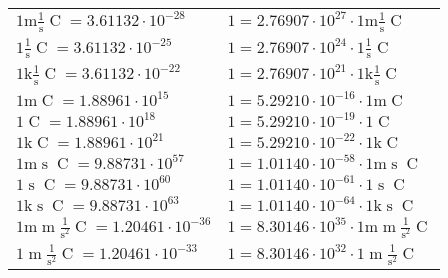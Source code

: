 \begin{center}
\begin{longtable}{l l}
{\color{gray}$1 \bm{\mathrm{ m}}{}\frac1{\operatorname{s}}{\operatorname{C}}{} = 3.61132\cdot10^{-28} $}   & {\color{gray}$ 1 = 2.76907\cdot10^{27} \cdot 1 \bm{\mathrm{ m}}{}\frac1{\operatorname{s}}{\operatorname{C}}{}$}  \\
{\color{black}$1 \bm{\mathrm{ }}{}\frac1{\operatorname{s}}{\operatorname{C}}{} = 3.61132\cdot10^{-25} $}   & {\color{black}$ 1 = 2.76907\cdot10^{24} \cdot 1 \bm{\mathrm{ }}{}\frac1{\operatorname{s}}{\operatorname{C}}{}$}  \\
{\color{gray}$1 \bm{\mathrm{ k}}{}\frac1{\operatorname{s}}{\operatorname{C}}{} = 3.61132\cdot10^{-22} $}   & {\color{gray}$ 1 = 2.76907\cdot10^{21} \cdot 1 \bm{\mathrm{ k}}{}\frac1{\operatorname{s}}{\operatorname{C}}{}$}  \\
{\color{gray}$1 \bm{\mathrm{ m}}{}{}{\operatorname{C}}{} = 1.88961\cdot10^{15} $}   & {\color{gray}$ 1 = 5.29210\cdot10^{-16} \cdot 1 \bm{\mathrm{ m}}{}{}{\operatorname{C}}{}$}  \\
{\color{black}$1 \bm{\mathrm{ }}{}{}{\operatorname{C}}{} = 1.88961\cdot10^{18} $}   & {\color{black}$ 1 = 5.29210\cdot10^{-19} \cdot 1 \bm{\mathrm{ }}{}{}{\operatorname{C}}{}$}  \\
{\color{gray}$1 \bm{\mathrm{ k}}{}{}{\operatorname{C}}{} = 1.88961\cdot10^{21} $}   & {\color{gray}$ 1 = 5.29210\cdot10^{-22} \cdot 1 \bm{\mathrm{ k}}{}{}{\operatorname{C}}{}$}  \\
{\color{gray}$1 \bm{\mathrm{ m}}{}{\operatorname{s}}{\operatorname{C}}{} = 9.88731\cdot10^{57} $}   & {\color{gray}$ 1 = 1.01140\cdot10^{-58} \cdot 1 \bm{\mathrm{ m}}{}{\operatorname{s}}{\operatorname{C}}{}$}  \\
{\color{black}$1 \bm{\mathrm{ }}{}{\operatorname{s}}{\operatorname{C}}{} = 9.88731\cdot10^{60} $}   & {\color{black}$ 1 = 1.01140\cdot10^{-61} \cdot 1 \bm{\mathrm{ }}{}{\operatorname{s}}{\operatorname{C}}{}$}  \\
{\color{gray}$1 \bm{\mathrm{ k}}{}{\operatorname{s}}{\operatorname{C}}{} = 9.88731\cdot10^{63} $}   & {\color{gray}$ 1 = 1.01140\cdot10^{-64} \cdot 1 \bm{\mathrm{ k}}{}{\operatorname{s}}{\operatorname{C}}{}$}  \\
{\color{gray}$1 \bm{\mathrm{ m}}{\operatorname{m}}\frac1{\operatorname{s}^2}{\operatorname{C}}{} = 1.20461\cdot10^{-36} $}   & {\color{gray}$ 1 = 8.30146\cdot10^{35} \cdot 1 \bm{\mathrm{ m}}{\operatorname{m}}\frac1{\operatorname{s}^2}{\operatorname{C}}{}$}  \\
{\color{black}$1 \bm{\mathrm{ }}{\operatorname{m}}\frac1{\operatorname{s}^2}{\operatorname{C}}{} = 1.20461\cdot10^{-33} $}   & {\color{black}$ 1 = 8.30146\cdot10^{32} \cdot 1 \bm{\mathrm{ }}{\operatorname{m}}\frac1{\operatorname{s}^2}{\operatorname{C}}{}$}  \\

\end{longtable}
\end{center}
